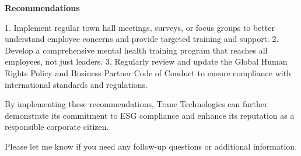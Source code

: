 \documentclass{article}
\begin{document}
\textbf{Recommendations}

1. Implement regular town hall meetings, surveys, or focus groups to better understand employee concerns and provide targeted training and support.
2. Develop a comprehensive mental health training program that reaches all employees, not just leaders.
3. Regularly review and update the Global Human Rights Policy and Business Partner Code of Conduct to ensure compliance with international standards and regulations.

By implementing these recommendations, Trane Technologies can further demonstrate its commitment to ESG compliance and enhance its reputation as a responsible corporate citizen.

Please let me know if you need any follow-up questions or additional information.

                
\end{document}

